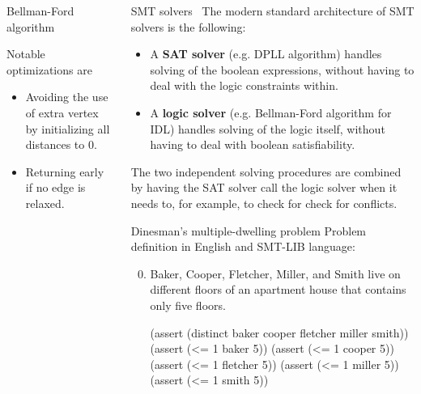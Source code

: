 \documentclass{beamer}
\begin{document}
\begin{frame}[fragile,t]
\begin{columns}[t,onlytextwidth]
\begin{column}{0.485\textwidth}
\begin{block}{Bellman-Ford algorithm~\cite{CLRS}}
\begin{figure}[h]
\begin{subfigure}{0.5\linewidth}
				\end{subfigure}
			\end{figure}

			Notable optimizations are
			\begin{itemize}
				\item Avoiding the use of extra vertex by initializing all distances to 0.
				\item Returning early if no edge is relaxed.
			\end{itemize}
		\end{block}
	\end{column}

	\begin{column}{0.485\textwidth}
		\begin{block}{SMT solvers~\cite{slides}}
			The modern standard architecture of SMT solvers is the following:
			\begin{itemize}
				\item A \textbf{SAT solver} (e.g. DPLL algorithm) handles solving of the boolean expressions, without having to deal with the logic constraints within.
				\item A \textbf{logic solver} (e.g. Bellman-Ford algorithm for IDL) handles solving of the logic itself, without having to deal with boolean satisfiability.
			\end{itemize}
			The two independent solving procedures are combined by having the SAT solver call the logic solver when it needs to, for example, to check for check for conflicts.
		\end{block}
	
		\begin{block}{Dinesman's multiple-dwelling problem} %
			Problem definition in English and SMT-LIB language:
			\begin{enumerate}
				\setcounter{enumi}{-1} %
				
				\item Baker, Cooper, Fletcher, Miller, and Smith live on different floors of an apartment house that contains only five floors.
				\begin{smtlib}
					(assert (distinct baker cooper fletcher miller smith))
					(assert (<= 1 baker 5))
					(assert (<= 1 cooper 5))
					(assert (<= 1 fletcher 5))
					(assert (<= 1 miller 5))
					(assert (<= 1 smith 5))
				\end{smtlib}
				

\end{enumerate}
\end{block}
\end{column}
\end{columns}
\end{frame}
\end{document}
